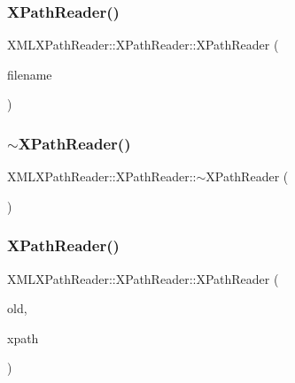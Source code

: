 \subsubsection{\texorpdfstring{XPathReader()}{XPathReader()}\hspace{0.1cm}{\footnotesize\ttfamily [3/8]}}
{\footnotesize\ttfamily X\+M\+L\+X\+Path\+Reader\+::\+X\+Path\+Reader\+::\+X\+Path\+Reader (\begin{DoxyParamCaption}\item[{const std\+::string \&}]{filename }\end{DoxyParamCaption})\hspace{0.3cm}{\ttfamily [inline]}}

\mbox{\label{classXMLXPathReader_1_1XPathReader_aedd43e5673d660cb93b8158166572521}} 
\subsubsection{\texorpdfstring{$\sim$XPathReader()}{~XPathReader()}\hspace{0.1cm}{\footnotesize\ttfamily [1/2]}}
{\footnotesize\ttfamily X\+M\+L\+X\+Path\+Reader\+::\+X\+Path\+Reader\+::$\sim$\+X\+Path\+Reader (\begin{DoxyParamCaption}\item[{void}]{ }\end{DoxyParamCaption})\hspace{0.3cm}{\ttfamily [inline]}}

\mbox{\label{classXMLXPathReader_1_1XPathReader_ae37728d823bbf1b7f4c09e3f474df32b}} 
\subsubsection{\texorpdfstring{XPathReader()}{XPathReader()}\hspace{0.1cm}{\footnotesize\ttfamily [4/8]}}
{\footnotesize\ttfamily X\+M\+L\+X\+Path\+Reader\+::\+X\+Path\+Reader\+::\+X\+Path\+Reader (\begin{DoxyParamCaption}\item[{\mbox{\hyperlink{classXMLXPathReader_1_1XPathReader}{X\+Path\+Reader}} \&}]{old,  }\item[{const std\+::string \&}]{xpath }\end{DoxyParamCaption})\hspace{0.3cm}{\ttfamily [inline]}}

